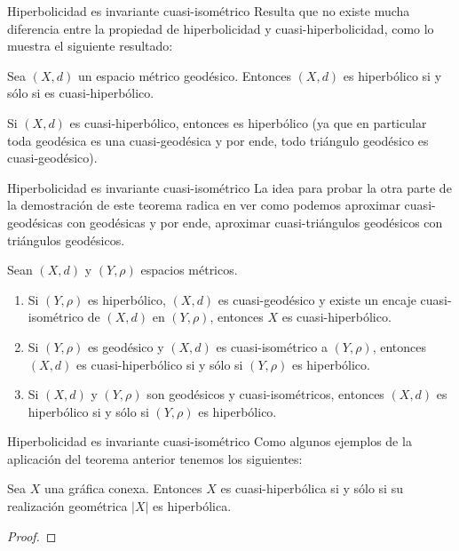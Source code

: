 \documentclass[xcolor=dvipsnames]{beamer}
\theoremstyle{largebreak}
\newcommand\abs[1]{\ensuremath{\left|#1\right|}}
\begin{document}
\begin{frame}{Hiperbolicidad es invariante cuasi-isométrico}
    Resulta que no existe mucha diferencia entre la propiedad de hiperbolicidad y cuasi-hiperbolicidad, como lo muestra el siguiente resultado:

    \begin{theor}
        Sea $(X,d)$ un espacio métrico geodésico. Entonces $(X,d)$ es hiperbólico si y sólo si es cuasi-hiperbólico.
    \end{theor}

    Si $(X,d)$ es cuasi-hiperbólico, entonces es hiperbólico (ya que en particular toda geodésica es una cuasi-geodésica y por ende, todo triángulo geodésico es cuasi-geodésico).

\end{frame}

\begin{frame}{Hiperbolicidad es invariante cuasi-isométrico}
    La idea para probar la otra parte de la demostración de este teorema radica en ver como podemos aproximar cuasi-geodésicas con geodésicas y por ende, aproximar cuasi-triángulos geodésicos con triángulos geodésicos.


    \begin{cor}
        Sean $(X,d)$ y $(Y,\rho)$ espacios métricos.
        \begin{enumerate}[label = \textit{(\arabic*)}]
            \item Si $(Y,\rho)$ es hiperbólico, $(X,d)$ es cuasi-geodésico y existe un encaje cuasi-isométrico de $(X,d)$ en $(Y,\rho)$, entonces $X$ es cuasi-hiperbólico.
            \item Si $(Y,\rho)$ es geodésico y $(X,d)$ es cuasi-isométrico a $(Y,\rho)$, entonces $(X,d)$ es cuasi-hiperbólico si y sólo si $(Y,\rho)$ es hiperbólico.
            \item Si $(X,d)$ y $(Y,\rho)$ son geodésicos y cuasi-isométricos, entonces $(X,d)$ es hiperbólico si y sólo si $(Y,\rho)$ es hiperbólico. 
        \end{enumerate}
    \end{cor}
\end{frame}

\begin{frame}{Hiperbolicidad es invariante cuasi-isométrico}
    Como algunos ejemplos de la aplicación del teorema anterior tenemos los siguientes:

    \begin{cor}
        Sea $X$ una gráfica conexa. Entonces $X$ es cuasi-hiperbólica si y sólo si su realización geométrica $\abs{X}$ es hiperbólica.
    \end{cor}

    \begin{proof}
        
    \end{proof}

\end{frame}
\end{document}
